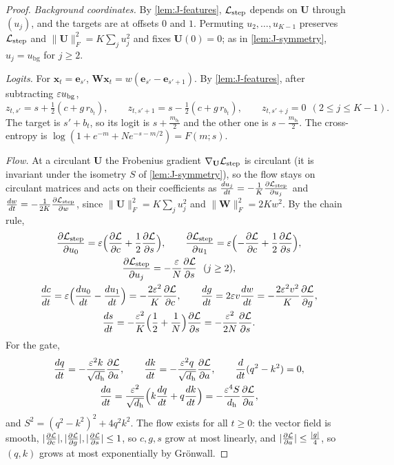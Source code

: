 \begin{proof}
\emph{Background coordinates.} By \cref{lem:J-features}, $\mathcal L_{\mathrm{step}}$ depends on $\mathbf U$ through $(u_j)$, and the targets are at offsets $0$ and $1$.
Permuting $u_2,\ldots,u_{K-1}$ preserves $\mathcal L_{\mathrm{step}}$ and $\|\mathbf U\|_F^2=K\sum_ju_j^2$ and fixes $\mathbf U(0)=0$; as in \cref{lem:J-symmetry},
$u_j=u_{\mathrm{bg}}$ for $j\ge2$.

\emph{Logits.} For $\bm x_t=\bm e_{s'}$, $\mathbf W\bm x_t=w(\bm e_{s'}-\bm e_{s'+1})$. By \cref{lem:J-features}, after subtracting $\varepsilon u_{\mathrm{bg}}$,
 $z_{t,s'}=s+\tfrac{1}{2}(c+g\,r_{b_t}),\qquad z_{t,s'+1}=s-\tfrac{1}{2}(c+g\,r_{b_t}),\qquad z_{t,s'+j}=0\ \ (2\le j\le K-1).$ 
The target is $s'+b_t$, so its logit is $s+\frac{m_{b_t}}{2}$ and the other one is $s-\frac{m_{b_t}}{2}$. The cross-entropy is
$\log(1+e^{-m}+Ne^{-s-m/2})=F(m;s)$.

\emph{Flow.} At a circulant $\mathbf U$ the Frobenius gradient $\nabla_{\mathbf U}\mathcal L_{\mathrm{step}}$ is circulant (it is invariant under the isometry $S$ of
\cref{lem:J-symmetry}), so the flow stays on circulant matrices and acts on their coefficients as $\ddt{u_j}=-\frac{1}{K}\pd{\Lstep}{u_j}$ and $\ddt{w}=-\frac{1}{2K}\pd{\Lstep}{w}$, since
$\|\mathbf U\|_F^2=K\sum_ju_j^2$ and $\|\mathbf W\|_F^2=2Kw^2$. By the chain rule,
\begin{gather*}
 \pd{\Lstep}{u_0}=\initscale\Bigl(\pd{\mathcal L}{c}+\tfrac{1}{2}\pd{\mathcal L}{s}\Bigr),\qquad \pd{\Lstep}{u_1}=\initscale\Bigl(-\pd{\mathcal L}{c}+\tfrac{1}{2}\pd{\mathcal L}{s}\Bigr),\\
 \pd{\Lstep}{u_j}=-\frac{\initscale}{N}\pd{\mathcal L}{s}\ \ (j\ge2),\\
 \ddt{c}=\initscale\Bigl(\ddt{u_0}-\ddt{u_1}\Bigr)=-\frac{2\initscale^2}{K}\pd{\mathcal L}{c},\qquad
 \ddt{g}=2\initscale v\ddt{w}=-\frac{2\initscale^2v^2}{K}\pd{\mathcal L}{g},\\
 \ddt{s}=-\frac{\initscale^2}{K}\Bigl(\frac{1}{2}+\frac{1}{N}\Bigr)\pd{\mathcal L}{s}=-\frac{\initscale^2}{2N}\pd{\mathcal L}{s}.
\end{gather*}
For the gate,
\begin{gather*}
 \ddt{q}=-\frac{\initscale^2k}{\sqrt{d_{\mathrm h}}}\pd{\mathcal L}{a},\qquad \ddt{k}=-\frac{\initscale^2q}{\sqrt{d_{\mathrm h}}}\pd{\mathcal L}{a},\qquad \frac{d}{dt}(q^2-k^2)=0,\\
 \ddt{a}=\frac{\initscale^2}{\sqrt{d_{\mathrm h}}}\Bigl(k\ddt{q}+q\ddt{k}\Bigr)=-\frac{\initscale^4S}{d_{\mathrm h}}\pd{\mathcal L}{a},
\end{gather*}
and $S^2=(q^2-k^2)^2+4q^2k^2$. The flow exists for all $t\ge0$: the vector field is smooth, $|\pd{\mathcal L}{c}|,|\pd{\mathcal L}{g}|,|\pd{\mathcal L}{s}|\le1$, so
$c,g,s$ grow at most linearly, and $|\pd{\mathcal L}{a}|\le\frac{|g|}{4}$, so $(q,k)$ grows at most exponentially by Gr\"onwall.
\end{proof}

